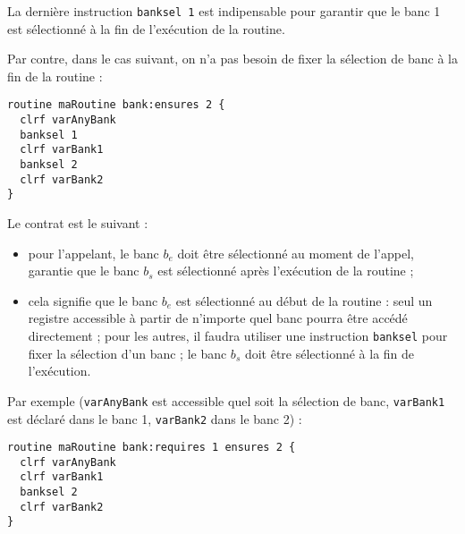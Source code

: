 La dernière instruction \texttt{banksel 1} est indipensable pour garantir que le banc 1 est sélectionné à la fin de l'exécution de la routine.


Par contre, dans le cas suivant, on n'a pas besoin de fixer la sélection de banc à la fin de la routine :
\begin{lstlisting}[language=piccolo]
routine maRoutine bank:ensures 2 {
  clrf varAnyBank
  banksel 1
  clrf varBank1
  banksel 2
  clrf varBank2
}
\end{lstlisting}













Le contrat est le suivant :
\begin{itemize}
  \item pour l'appelant, le banc $b_e$ doit être sélectionné au moment de l'appel, garantie que le banc $b_s$ est sélectionné après l'exécution de la routine ; 
  \item cela signifie que le banc $b_e$ est sélectionné au début de la routine : seul un registre accessible à partir de n'importe quel banc pourra être accédé directement ; pour les autres, il faudra utiliser une instruction \texttt{banksel} pour fixer la sélection d'un banc ; le banc $b_s$ doit être sélectionné à la fin de l'exécution.
\end{itemize}

Par exemple (\texttt{varAnyBank} est accessible quel soit la sélection de banc, \texttt{varBank1} est déclaré dans le banc 1, \texttt{varBank2} dans le banc 2) :
\begin{lstlisting}[language=piccolo]
routine maRoutine bank:requires 1 ensures 2 {
  clrf varAnyBank
  clrf varBank1
  banksel 2
  clrf varBank2
}
\end{lstlisting}






